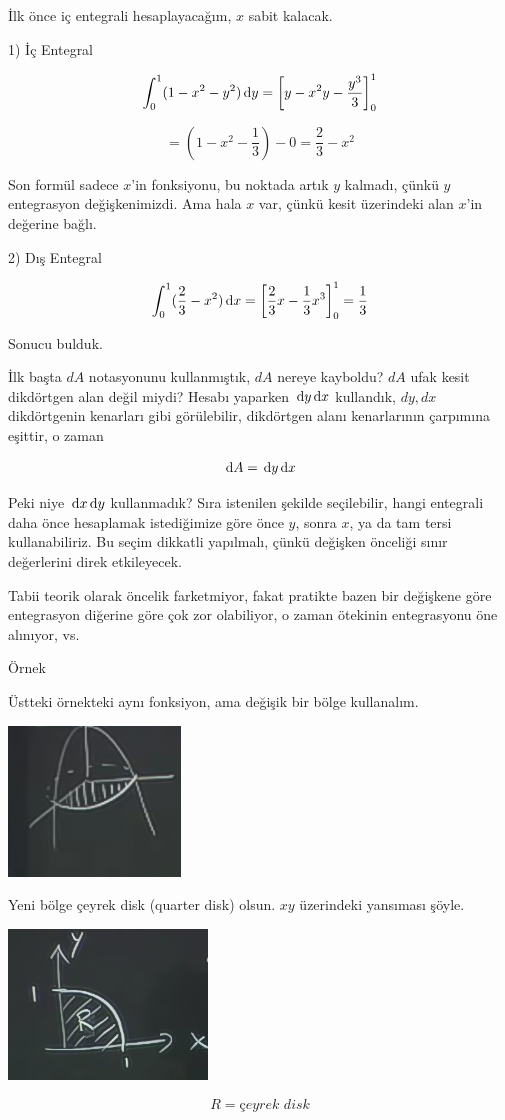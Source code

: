 \documentclass[12pt,fleqn]{article}\usepackage{../../common}
\begin{document}
İlk önce iç entegrali hesaplayacağım, $x$ sabit kalacak. 

1) İç Entegral

$$
\int_0^1 (1-x^2-y^2) \,\mathrm{d} y
= \bigg[ y - x^2y - \frac{y^3}{3} \bigg]_0^1
$$

$$ = (1 - x^2 - \frac{1}{3}) - 0 = \frac{2}{3} - x^2$$

Son formül sadece $x$'in fonksiyonu, bu noktada artık $y$ kalmadı, çünkü $y$
entegrasyon değişkenimizdi. Ama hala $x$ var, çünkü kesit üzerindeki alan $x$'in
değerine bağlı.

2) Dış Entegral 

$$
\int_0^1 (\frac{2}{3} - x^2) \,\mathrm{d} x
= \bigg[ \frac{2}{3}x - \frac{1}{3}x^3 \bigg]_0^1 = \frac{1}{3}
 $$

Sonucu bulduk. 

İlk başta $dA$ notasyonunu kullanmıştık, $dA$ nereye kayboldu? $dA$ ufak kesit
dikdörtgen alan değil miydi? Hesabı yaparken $\,\mathrm{d} y \,\mathrm{d} x$ kullandık, $dy,dx$
dikdörtgenin kenarları gibi görülebilir, dikdörtgen alanı kenarlarının çarpımına
eşittir, o zaman

$$ \,\mathrm{d} A = \,\mathrm{d} y \,\mathrm{d} x $$

Peki niye $\,\mathrm{d} x \,\mathrm{d} y$ kullanmadık? Sıra istenilen şekilde seçilebilir, hangi
entegrali daha önce hesaplamak istediğimize göre önce $y$, sonra $x$, ya da
tam tersi kullanabiliriz. Bu seçim dikkatli yapılmalı, çünkü değişken
önceliği sınır değerlerini direk etkileyecek. 

Tabii teorik olarak öncelik farketmiyor, fakat pratikte bazen bir değişkene
göre entegrasyon diğerine göre çok zor olabiliyor, o zaman ötekinin
entegrasyonu öne alınıyor, vs.

Örnek

Üstteki örnekteki aynı fonksiyon, ama değişik bir bölge kullanalım. 
\begin{center}
\includegraphics[height=4cm]{16_9.png}
\end{center}
Yeni bölge çeyrek disk (quarter disk) olsun. $xy$ üzerindeki yansıması
şöyle. 
\begin{center}
\includegraphics[height=4cm]{16_10.png}
\end{center}
$$ R = \textit{çeyrek disk}  $$
\end{document}
